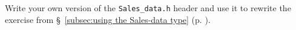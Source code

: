 %
%
\begin{question}
Write your own version of the \verb|Sales_data.h| header and
use it to rewrite the exercise from \S~\ref{subsec:using the Sales-data type} (p. \pageref{subsec:using the Sales-data type}).
\end{question}
